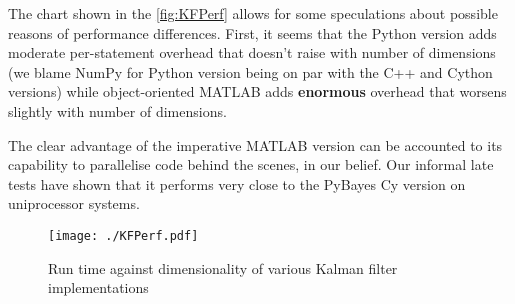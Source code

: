 The chart shown in the \autoref{fig:KFPerf} allows for some speculations about possible reasons
of performance differences. First, it seems that the Python version adds moderate per-statement
overhead that doesn't raise with number of dimensions (we blame NumPy for Python version being
on par with the C++ and Cython versions) while object-oriented MATLAB adds \textbf{enormous} overhead
that worsens slightly with number of dimensions.

The clear advantage of the imperative MATLAB version can be accounted to its capability to parallelise
code behind the scenes, in our belief. Our informal late tests have shown that it performs very
close to the PyBayes Cy version on uniprocessor systems.

\begin{figure}[h!]
	\centering
	\texttt{[image: ./KFPerf.pdf]}
	\caption{Run time against dimensionality of various Kalman filter implementations}
	\label{fig:KFPerf}
\end{figure}
